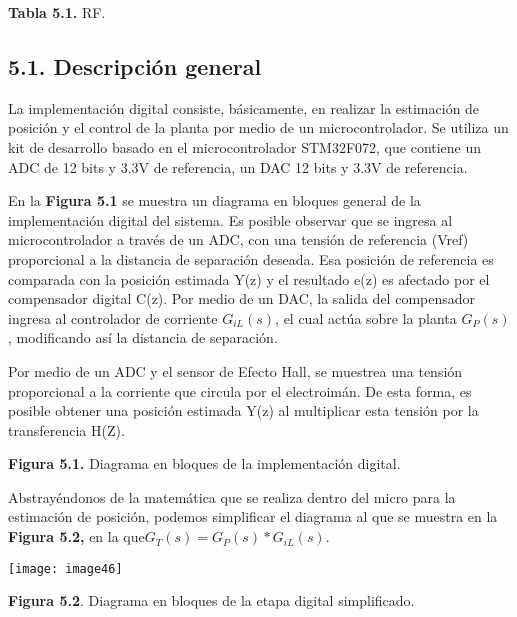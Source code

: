 \documentclass{article} %
\begin{document}
\textbf{Tabla 5.1. }RF.\textbf{ }

\noindent 
\subsection{5.1. Descripci\'{o}n general}

\noindent La implementaci\'{o}n digital consiste, b\'{a}sicamente, en realizar la estimaci\'{o}n de posici\'{o}n y el control de la planta por medio de un microcontrolador. Se utiliza un kit de desarrollo basado en el microcontrolador STM32F072, que contiene un ADC de 12 bits y 3.3V de referencia, un DAC 12 bits y 3.3V de referencia.

\noindent 

\noindent En la \textbf{Figura 5.1 }se muestra un diagrama en bloques general de la implementaci\'{o}n digital del sistema. Es posible observar que se ingresa al microcontrolador a trav\'{e}s de un ADC, con una tensi\'{o}n de referencia (Vref) proporcional a la distancia de separaci\'{o}n deseada. Esa posici\'{o}n de referencia es comparada con la posici\'{o}n estimada Y(z) y el resultado e(z) es afectado por el compensador digital C(z). Por medio de un DAC, la salida del compensador ingresa al controlador de corriente $G_{iL}(s)$, el cual act\'{u}a sobre la planta $G_P(s)$, modificando as\'{i} la distancia de separaci\'{o}n.

\noindent 

\noindent Por medio de un ADC y el sensor de Efecto Hall, se muestrea una tensi\'{o}n proporcional a la corriente que circula por el electroim\'{a}n. De esta forma, es posible obtener una posici\'{o}n estimada Y(z) al multiplicar esta tensi\'{o}n por la transferencia H(Z).\underbar{}

\noindent {}

\noindent \textbf{Figura 5.1.} Diagrama en bloques de la implementaci\'{o}n digital. 

\noindent 

\noindent Abstray\'{e}ndonos de la matem\'{a}tica que se realiza dentro del micro para la estimaci\'{o}n de posici\'{o}n, podemos simplificar el diagrama al que se muestra en la \textbf{Figura 5.2, }en la que$G_T(s)=G_P(s)*G_{iL}(s)$.

\noindent 

\noindent \texttt{[image: image46]}

\noindent \textbf{Figura 5.2}. Diagrama en bloques de la etapa digital simplificado.
\end{document}
